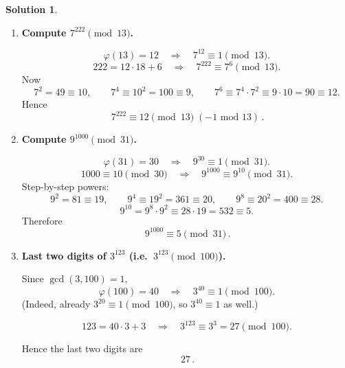 \documentclass[12pt]{article}
\theoremstyle{definition} %
\newtheorem{solution}{Solution}
\theoremstyle{plain} %
\begin{document}
      \begin{solution}
        \begin{enumerate}[]
        \item \textbf{Compute $7^{222}\pmod{13}$.}
        
        \[
        \varphi(13)=12
        \quad\Longrightarrow\quad
        7^{12}\equiv1\pmod{13}.
        \]
        \[
        222 = 12\cdot18 + 6
        \quad\Longrightarrow\quad
        7^{222}\equiv 7^{6}\pmod{13}.
        \]
        Now
        \[
        7^{2}=49\equiv10,\qquad
        7^{4}\equiv 10^{2}=100\equiv 9,\qquad
        7^{6}\equiv 7^{4}\!\cdot7^{2}\equiv9\cdot10=90\equiv12.
        \]
        Hence
        \[
        \boxed{\,7^{222}\equiv12\pmod{13}\;(-1\text{ mod }13)\, }.
        \]
        
        \item \textbf{Compute $9^{1000}\pmod{31}$.}
        
        \[
        \varphi(31)=30
        \quad\Longrightarrow\quad
        9^{30}\equiv1\pmod{31}.
        \]
        \[
        1000\equiv 10\pmod{30}
        \quad\Longrightarrow\quad
        9^{1000}\equiv 9^{10}\pmod{31}.
        \]
        Step-by-step powers:
        \[
        9^{2}=81\equiv19,\qquad
        9^{4}\equiv19^{2}=361\equiv20,\qquad
        9^{8}\equiv20^{2}=400\equiv28.
        \]
        \[
        9^{10}=9^{8}\cdot9^{2}\equiv28\cdot19=532\equiv5.
        \]
        Therefore
        \[
        \boxed{\,9^{1000}\equiv5\pmod{31}\, }.
        \]
        
        \item \textbf{Last two digits of $3^{123}$ (i.e.\ $3^{123}\pmod{100}$).}
        
        Since $\gcd(3,100)=1$,
        \[
        \varphi(100)=40
        \quad\Longrightarrow\quad
        3^{40}\equiv1\pmod{100}.
        \]
        (Indeed, already $3^{20}\equiv1\pmod{100}$, so $3^{40}\equiv1$ as well.)
        
        \[
        123 = 40\cdot3 + 3
        \quad\Longrightarrow\quad
        3^{123}\equiv 3^{3}=27\pmod{100}.
        \]
        
        Hence the last two digits are
        \[
        \boxed{\,27\, }.
        \]
        \end{enumerate}
        \end{solution}
\end{document}

